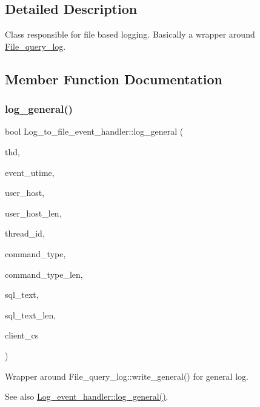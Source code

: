 \subsection{Detailed Description}
Class responsible for file based logging. Basically a wrapper around \mbox{\hyperlink{classFile__query__log}{File\+\_\+query\+\_\+log}}. 

\subsection{Member Function Documentation}
\mbox{\label{classLog__to__file__event__handler_a87190427f382788704a86748f3d3d567}} 
\subsubsection{\texorpdfstring{log\+\_\+general()}{log\_general()}}
{\footnotesize\ttfamily bool Log\+\_\+to\+\_\+file\+\_\+event\+\_\+handler\+::log\+\_\+general (\begin{DoxyParamCaption}\item[{T\+HD $\ast$}]{thd,  }\item[{ulonglong}]{event\+\_\+utime,  }\item[{const char $\ast$}]{user\+\_\+host,  }\item[{size\+\_\+t}]{user\+\_\+host\+\_\+len,  }\item[{my\+\_\+thread\+\_\+id}]{thread\+\_\+id,  }\item[{const char $\ast$}]{command\+\_\+type,  }\item[{size\+\_\+t}]{command\+\_\+type\+\_\+len,  }\item[{const char $\ast$}]{sql\+\_\+text,  }\item[{size\+\_\+t}]{sql\+\_\+text\+\_\+len,  }\item[{const C\+H\+A\+R\+S\+E\+T\+\_\+\+I\+N\+FO $\ast$}]{client\+\_\+cs }\end{DoxyParamCaption})\hspace{0.3cm}{\ttfamily [virtual]}}

Wrapper around File\+\_\+query\+\_\+log\+::write\+\_\+general() for general log. \begin{DoxySeeAlso}{See also}
\mbox{\hyperlink{classLog__event__handler_aa9f98b8c0b48eb846877fe9d2496560e}{Log\+\_\+event\+\_\+handler\+::log\+\_\+general()}}. 
\end{DoxySeeAlso}


